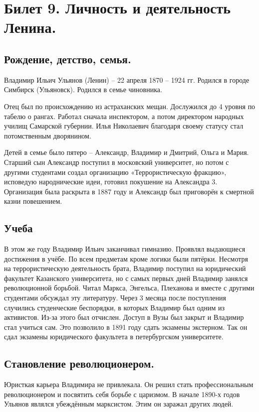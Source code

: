 \section{Билет 9. Личность и деятельность Ленина.}

\subsection{Рождение, детство, семья.}

Владимир Ильич Ульянов (Ленин) – 22 апреля 1870 – 1924 гг. Родился в городе Симбирск (Ульяновск). Родился в семье чиновника. 

Отец был по происхождению из астраханских мещан. Дослужился до 4 уровня по табелю о рангах. Работал сначала инспектором, а потом директором народных училищ Самарской губернии. Илья Николаевич благодаря своему статусу стал потомственным дворянином.

Детей в семье было пятеро – Александр, Владимир и Дмитрий, Ольга и Мария. Старший сын Александр поступил в московский университет, но потом с другими студентами создал организацию «Террористическую фракцию», исповедую народнические идеи, готовил покушение на Александра 3. Организация была раскрыта в 1887 году и Александр был приговорён к смертной казни повешением. 

\subsection{Учеба}

В этом же году Владимир Ильич заканчивал гимназию. Проявлял выдающиеся достижения в учёбе. По всем предметам кроме логики были пятёрки. Несмотря на террористическую деятельность брата, Владимир поступил на юридический факультет Казанского университета, но с самых первых дней Владимир занялся революционной борьбой. Читал Маркса, Энгельса, Плеханова и вместе с другими студентами обсуждал эту литературу. Через 3 месяца после поступления случились студенческие беспорядки, в которых Владимир был одним из активистов. Из-за этого был отчислен. Доступ в Вузы был закрыт и Владимир стал учиться сам. Это позволило в 1891 году сдать экзамены экстерном. Так он сдал экзамены юридического факультета в петербургском университете.

\subsection{Становление революционером.}

Юристкая карьера Владимира не привлекала. Он решил стать профессиональным революционером и посвятить себя борьбе с царизмом. В начале 1890-х годов Ульянов являлся убеждённым марксистом. Этим он заражал других людей.

